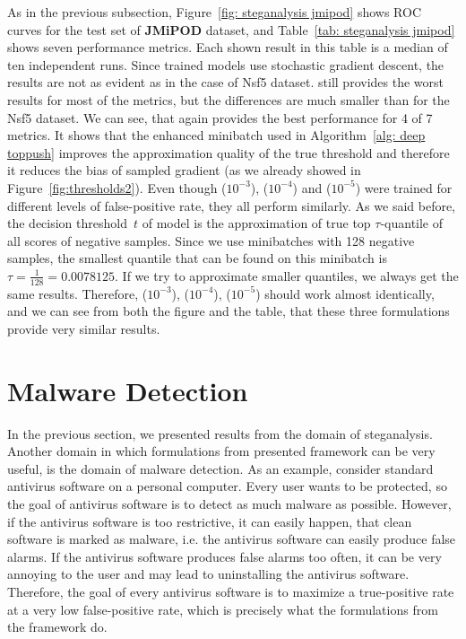As in the previous subsection, Figure~\ref{fig: steganalysis jmipod} shows ROC curves for the test set of \textbf{JMiPOD} dataset, and Table~\ref{tab: steganalysis jmipod} shows seven performance metrics. Each shown result in this table is a median of ten independent runs. Since trained models use stochastic gradient descent, the results are not as evident as in the case of Nsf5 dataset. \BaseLine still provides the worst results for most of the metrics, but the differences are much smaller than for the Nsf5 dataset. We can see, that \DeepTopPush again provides the best performance for 4 of 7 metrics. It shows that the enhanced minibatch used in \DeepTopPush Algorithm~\ref{alg: deep toppush} improves the approximation quality of the true threshold and therefore it reduces the bias of sampled gradient (as we already showed in Figure~\ref{fig:thresholds2}). Even though \PatMatNP($10^{-3}$), \PatMatNP($10^{-4}$) and \PatMatNP($10^{-5}$) were trained for different levels of false-positive rate, they all perform similarly. As we said before, the decision threshold~$t$ of \PatMatNP model is the approximation of true top $\tau$-quantile of all scores of negative samples. Since we use minibatches with 128 negative samples, the smallest quantile that can be found on this minibatch is~$\tau = \frac{1}{128}=0.0078125.$ If we try to approximate smaller quantiles, we always get the same results. Therefore, \PatMatNP($10^{-3}$), \PatMatNP($10^{-4}$), \PatMatNP($10^{-5}$) should work almost identically, and we can see from both the figure and the table, that these three formulations provide very similar results.

\section{Malware Detection}\label{sec: malware detection}

In the previous section, we presented results from the domain of steganalysis. Another domain in which formulations from presented framework can be very useful, is the domain of malware detection. As an example, consider standard antivirus software on a personal computer. Every user wants to be protected, so the goal of antivirus software is to detect as much malware as possible. However, if the antivirus software is too restrictive, it can easily happen, that clean software is marked as malware, i.e. the antivirus software can easily produce false alarms. If the antivirus software produces false alarms too often, it can be very annoying to the user and may lead to uninstalling the antivirus software. Therefore, the goal of every antivirus software is to maximize a true-positive rate at a very low false-positive rate, which is precisely what the formulations from the framework do.

